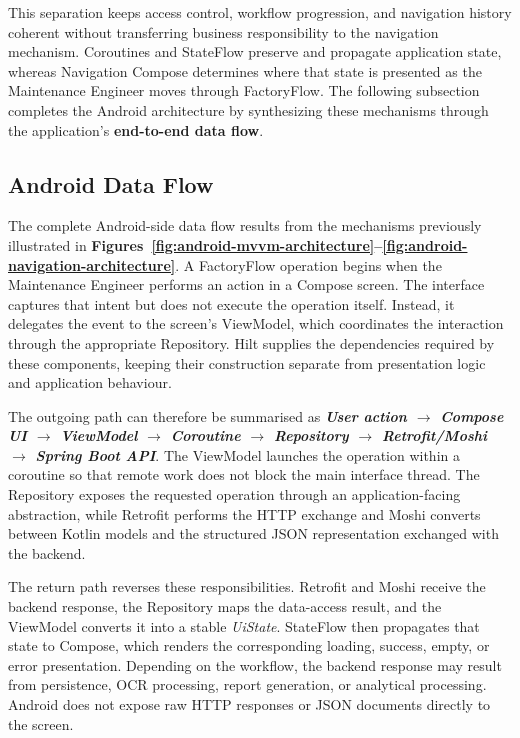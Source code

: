 This separation keeps access control, workflow progression, and navigation history coherent without transferring business responsibility to the navigation mechanism. Coroutines and StateFlow preserve and propagate application state, whereas Navigation Compose determines where that state is presented as the Maintenance Engineer moves through FactoryFlow. The following subsection completes the Android architecture by synthesizing these mechanisms through the application's \textbf{end-to-end data flow}.


\subsection{Android Data Flow}
\label{subsec:android-data-flow}

The complete Android-side data flow results from the mechanisms previously illustrated in \textbf{Figures~\ref{fig:android-mvvm-architecture}--\ref{fig:android-navigation-architecture}}. A FactoryFlow operation begins when the Maintenance Engineer performs an action in a Compose screen. The interface captures that intent but does not execute the operation itself. Instead, it delegates the event to the screen's ViewModel, which coordinates the interaction through the appropriate Repository. Hilt supplies the dependencies required by these components, keeping their construction separate from presentation logic and application behaviour.

The outgoing path can therefore be summarised as \textbf{\textit{User action $\rightarrow$\allowbreak{} Compose UI $\rightarrow$\allowbreak{} ViewModel $\rightarrow$\allowbreak{} Coroutine $\rightarrow$\allowbreak{} Repository $\rightarrow$\allowbreak{} Retrofit/Moshi $\rightarrow$\allowbreak{} Spring Boot API}}. The ViewModel launches the operation within a coroutine so that remote work does not block the main interface thread. The Repository exposes the requested operation through an application-facing abstraction, while Retrofit performs the HTTP exchange and Moshi converts between Kotlin models and the structured JSON representation exchanged with the backend.

The return path reverses these responsibilities. Retrofit and Moshi receive the backend response, the Repository maps the data-access result, and the ViewModel converts it into a stable \textit{UiState}. StateFlow then propagates that state to Compose, which renders the corresponding loading, success, empty, or error presentation. Depending on the workflow, the backend response may result from persistence, OCR processing, report generation, or analytical processing. Android does not expose raw HTTP responses or JSON documents directly to the screen.

